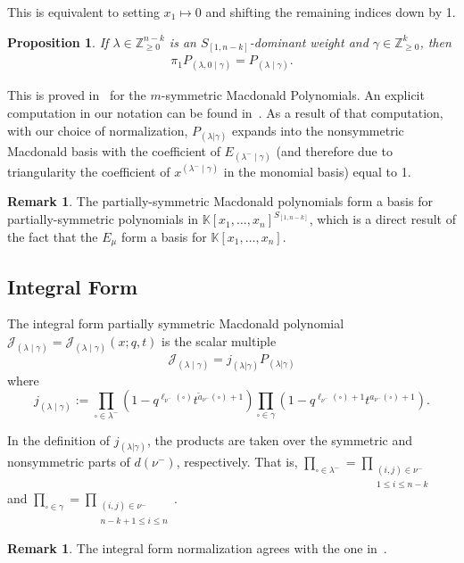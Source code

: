 \documentclass[11pt]{article}
\newtheorem{prop}[theo]{Proposition}
\theoremstyle{definition}
\newtheorem{rema}[theo]{Remark}
\numberwithin{equation}{section}
\newcommand{\Z}{\mathbb{Z}}
\newcommand{\Lq}{\mathbb{K}}
\newcommand{\Sn}{S_{[1,n-k]}}
\newcommand{\JJ}{\mathcal{J}_{(\lambda \mid \gamma)}}
\newcommand{\lambdamingamma}{(\lambda^- \mid \gamma)}
\newcommand{\jj}{j_{(\lambda \mid \gamma)}}
\newcommand{\symmetricprod}{\prod\limits_{\square \in \lambda^-}}
\newcommand{\nonsymmetricprod}{\prod\limits_{\square \in \gamma}}
\newcommand{\dg}{d}
\begin{document}
This is equivalent to setting $x_1 \mapsto 0$ and shifting the remaining indices down by 1.


\begin{prop} If $\lambda \in \Z_{\geq 0}^{n-k}$ is an $S_{[1,n-k]}$-dominant weight and $\gamma \in \Z_{\geq 0}^k$, then
\begin{align}\label{stability}\pi_1 P_{(\lambda,0\mid\gamma)} =  P_{(\lambda\mid\gamma)}.\end{align}\end{prop}

This is proved in~\cite{Lapointe} for the $m$-symmetric Macdonald Polynomials. An explicit computation in our notation can be found in~\cite{Dissertation}. As a result of that computation, with our choice of normalization, $P_{(\lambda|\gamma)}$ expands into the nonsymmetric Macdonald basis with the coefficient of $E_{\lambdamingamma}$ (and therefore due to triangularity the coefficient of $x^{\lambdamingamma}$ in the monomial basis) equal to 1.

\begin{rema}
    The partially-symmetric Macdonald polynomials form a basis for partially-symmetric polynomials in $\Lq[x_1, \dotsc, x_n]^{\Sn}$, which is a direct result of the fact that the $E_\mu$ form a basis for $\Lq[x_1,\dotsc,x_n]$.
\end{rema}


\subsection{Integral Form}\label{integralformsection}
The integral form partially symmetric Macdonald polynomial $\JJ=\JJ(x;q,t)$ is the scalar multiple
\[
\JJ = j_{(\lambda|\gamma)}P_{(\lambda|\gamma)}
\]
where
\[
\jj := \symmetricprod (1-q^{\ell_{\nu^-}(\square)}t^{\tilde{a}_{\nu^-}(\square) + 1}) \nonsymmetricprod(1-q^{\ell_{\nu^-}(\square) + 1}t^{a_{\nu^-}(\square) + 1}).
\]


In the definition of $j_{(\lambda|\gamma)}$, the products are taken over the symmetric and nonsymmetric parts of $\dg(\nu^-)$, respectively. That is, $\displaystyle{\symmetricprod}=\displaystyle{\prod_{\substack{(i,j) \in \nu^-\\ 1\leq i \leq n-k}}}$ and $\displaystyle{\nonsymmetricprod}=\displaystyle{\prod_{\substack{(i,j) \in \nu^-\\ n-k+1 \leq i \leq n}}}$.

\begin{rema}
    The integral form normalization agrees with the one in~\cite{Lapointe}.
\end{rema}
\end{document}
